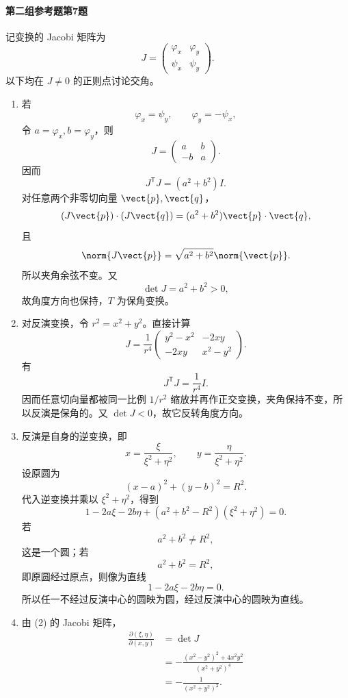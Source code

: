 \paragraph{第二组参考题第7题}
\begin{xsolution}
记变换的 Jacobi 矩阵为
\[
  J=\begin{pmatrix}
  \varphi_x&\varphi_y\\
  \psi_x&\psi_y
  \end{pmatrix}.
\]
以下均在 $J\ne0$ 的正则点讨论交角。

\begin{enumerate}[label=(\arabic*)]
  \item 若
  \[
    \varphi_x=\psi_y,
    \qquad
    \varphi_y=-\psi_x,
  \]
  令 $a=\varphi_x,b=\varphi_y$，则
  \[
    J=\begin{pmatrix}a&b\\-b&a\end{pmatrix}.
  \]
  因而
  \[
    J^{\mathsf T}J=(a^2+b^2)I.
  \]
  对任意两个非零切向量 $\vect{p},\vect{q}$，
  \[
    (J\vect{p})\cdot(J\vect{q})
    =(a^2+b^2)\vect{p}\cdot\vect{q},
  \]
  且
  \[
    \norm{J\vect{p}}=\sqrt{a^2+b^2}\norm{\vect{p}}.
  \]
  所以夹角余弦不变。又
  \[
    \det J=a^2+b^2>0,
  \]
  故角度方向也保持，$T$ 为保角变换。

  \item 对反演变换，令 $r^2=x^2+y^2$。直接计算
  \[
    J=\frac1{r^4}
    \begin{pmatrix}
      y^2-x^2&-2xy\\
      -2xy&x^2-y^2
    \end{pmatrix}.
  \]
  有
  \[
    J^{\mathsf T}J=\frac1{r^4}I.
  \]
  因而任意切向量都被同一比例 $1/r^2$ 缩放并再作正交变换，夹角保持不变，所以反演是保角的。又 $\det J<0$，故它反转角度方向。

  \item 反演是自身的逆变换，即
  \[
    x=\frac{\xi}{\xi^2+\eta^2},
    \qquad
    y=\frac{\eta}{\xi^2+\eta^2}.
  \]
  设原圆为
  \[
    (x-a)^2+(y-b)^2=R^2.
  \]
  代入逆变换并乘以 $\xi^2+\eta^2$，得到
  \[
    1-2a\xi-2b\eta
    +(a^2+b^2-R^2)(\xi^2+\eta^2)=0.
  \]
  若
  \[
    a^2+b^2\ne R^2,
  \]
  这是一个圆；若
  \[
    a^2+b^2=R^2,
  \]
  即原圆经过原点，则像为直线
  \[
    1-2a\xi-2b\eta=0.
  \]
  所以任一不经过反演中心的圆映为圆，经过反演中心的圆映为直线。

  \item 由 (2) 的 Jacobi 矩阵，
  \[
  \begin{aligned}
    \frac{\partial(\xi,\eta)}{\partial(x,y)}
    &=\det J\\
    &=-\frac{(x^2-y^2)^2+4x^2y^2}{(x^2+y^2)^4}\\
    &=-\frac1{(x^2+y^2)^2}.
  \end{aligned}
  \]


\end{enumerate}
\end{xsolution}
